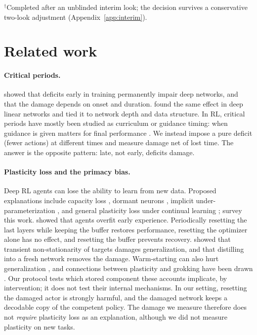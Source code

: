\documentclass[10pt]{article} %
\begin{document}
\begin{table}[t]
\smallskip
{\scriptsize $^\dagger$Completed after an unblinded interim look; the decision survives a conservative two-look adjustment (Appendix~\ref{app:interim}).}
\end{table}

\section{Related work}

\paragraph{Critical periods.}
\citet{achille2019critical} showed that deficits early in training permanently impair deep networks, and that the damage depends on onset and duration. \citet{kleinman2024critical} found the same effect in deep linear networks and tied it to network depth and data structure. In RL, critical periods have mostly been studied as curriculum or guidance timing: when guidance is given matters for final performance \citep{park2021toddler,park2022multistage,dekleijn2022critical}. We instead impose a pure deficit (fewer actions) at different times and measure damage net of lost time. The answer is the opposite pattern: late, not early, deficits damage.

\paragraph{Plasticity loss and the primacy bias.}
Deep RL agents can lose the ability to learn from new data. Proposed explanations include capacity loss \citep{lyle2022capacity}, dormant neurons \citep{sokar2023dormant,xu2024drm}, implicit under-parameterization \citep{kumar2021implicit}, and general plasticity loss under continual learning \citep{lyle2023plasticity,dohare2024loss,juliani2024onpolicy}; \citet{klein2024survey} survey this work. \citet{nikishin2022primacy} showed that agents overfit early experience. Periodically resetting the last layers while keeping the buffer restores performance, resetting the optimizer alone has no effect, and resetting the buffer prevents recovery. \citet{igl2021transient} showed that transient non-stationarity of targets damages generalization, and that distilling into a fresh network removes the damage. Warm-starting can also hurt generalization \citep{ash2020warm}, and connections between plasticity and grokking have been drawn \citep{lyle2025grokking}. Our protocol tests which stored component these accounts implicate, by intervention; it does not test their internal mechanisms. In our setting, resetting the damaged actor is strongly harmful, and the damaged network keeps a decodable copy of the competent policy. The damage we measure therefore does not \emph{require} plasticity loss as an explanation, although we did not measure plasticity on new tasks.
\end{document}
